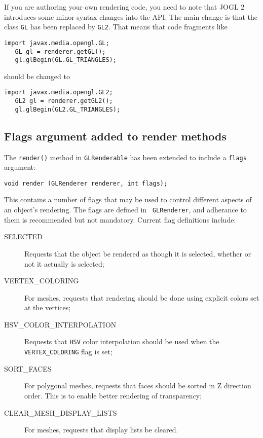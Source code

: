 \documentclass{article}
\begin{document}
If you are authoring your own rendering code, you need to note that
JOGL 2 introduces some minor syntax changes into the API. The main
change is that the class {\tt GL} has been replaced by {\tt GL2}.
That means that code fragments like
\begin{lstlisting}[]
   import javax.media.opengl.GL;
   GL gl = renderer.getGL();
   gl.glBegin(GL.GL_TRIANGLES);
\end{lstlisting}
should be changed to
\begin{lstlisting}[]
   import javax.media.opengl.GL2;
   GL2 gl = renderer.getGL2();
   gl.glBegin(GL2.GL_TRIANGLES);
\end{lstlisting}

\subsection*{Flags argument added to render methods}

The {\tt render()} method in {\tt GLRenderable} 
has been extended to include a {\tt flags}
argument:
\begin{lstlisting}[]
   void render (GLRenderer renderer, int flags);
\end{lstlisting}
This contains a number of flags that may be used to control different
aspects of an object's rendering.  The flags are defined in {\tt
GLRenderer}, and adherance to them is recommended but not
mandatory. Current flag definitions include:

\begin{description}

\item[SELECTED] Requests that the object be rendered as though it
is selected, whether or not it actually is selected;

\item[VERTEX\_COLORING] For meshes, requests that rendering should
be done using explicit colors set at the vertices;

\item[HSV\_COLOR\_INTERPOLATION] Requests that {\tt HSV} color
interpolation should be used when the {\tt VERTEX\_COLORING}
flag is set;

\item[SORT\_FACES] For polygonal meshes, requests that faces should
be sorted in Z direction order. This is to enable better rendering of
transparency;

\item[CLEAR\_MESH\_DISPLAY\_LISTS] For meshes, requests that display
lists be cleared.

\end{description}
\end{document}
